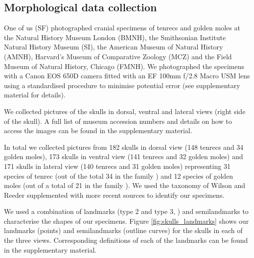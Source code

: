 \documentclass[12pt,a4paper]{article}
\begin{document}
	

\subsection{Morphological data collection} 
	
	One of us (SF) photographed cranial specimens of tenrecs and golden moles at the Natural History Museum London (BMNH), the Smithsonian Institute Natural History Museum (SI), the American Museum of Natural History (AMNH), Harvard's Museum of Comparative Zoology (MCZ) and the Field Museum of Natural History, Chicago (FMNH). We photographed the specimens with a Canon EOS 650D camera fitted with an EF 100mm f/2.8 Macro USM lens using a standardised procedure to minimise potential error (see supplementary material for details). 

	We collected pictures of the skulls in dorsal, ventral and lateral views (right side of the skull). A full list of museum accession numbers and details on how to access the images can be found in the supplementary material.
	
	

	In total we collected pictures from 182 skulls in dorsal view (148 tenrecs and 34 golden moles), 173 skulls in ventral view (141 tenrecs and 32 golden moles) and 171 skulls in lateral view (140 tenrecs and 31 golden moles) representing 31 species of tenrec (out of the total 34 in the family \citep{Olson2013}) and 12 species of golden moles (out of a total of 21 in the family \citep{Asher2010}). We used the taxonomy of Wilson and Reeder \citeyearpar{Wilson2005} supplemented with more recent sources \citep{Olson2013} to identify our specimens. 
	

	We used a combination of landmarks (type 2 and type 3, \citep{Zelditch2012}) and semilandmarks to characterise the shapes of our specimens. Figure \ref{fig:skulls_landmarks} shows our landmarks (points) and semilandmarks (outline curves) for the skulls in each of the three views. Corresponding definitions of each of the landmarks can be found in the supplementary material.
	
\end{document}
